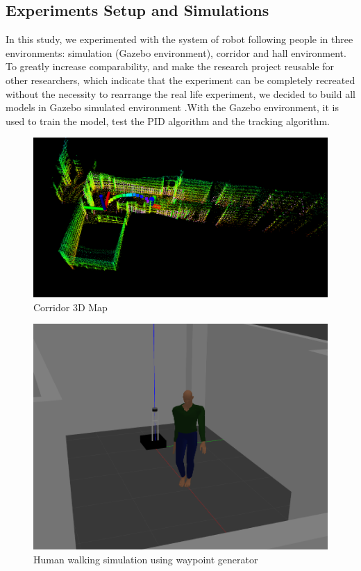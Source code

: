 \subsection{Experiments Setup and Simulations}

In this study, we experimented with the system of robot following people in three 
environments: simulation (Gazebo environment), corridor and hall environment. 
To greatly increase comparability, and make the research project reusable for other
researchers, which indicate that the experiment can be completely recreated without
the necessity to rearrange the real life experiment, we decided to build all
models in Gazebo simulated environment .With the Gazebo environment, it is used to train 
the model, test the PID algorithm and the tracking algorithm.

\begin{figure}[!htb]
    \centering
    \includegraphics[scale=0.26]{figures/chap4_fig/Platform/Lego-loam-map.png}
    \caption{Corridor 3D Map}
    \label{Chap4:Fig12}
\end{figure}

\begin{figure}[!htb]
    \centering
    \includegraphics[scale=0.3]{figures/chap4_fig/Platform/human_simulation.png}
    \caption{Human walking simulation using waypoint generator}
    \label{Chap4:Fig11}
\end{figure}

